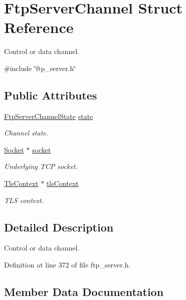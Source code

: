 \hypertarget{structFtpServerChannel}{}\section{Ftp\+Server\+Channel Struct Reference}
\label{structFtpServerChannel}


Control or data channel.  




{\ttfamily \#include \char`\"{}ftp\+\_\+server.\+h\char`\"{}}

\subsection*{Public Attributes}
\begin{DoxyCompactItemize}
\item 
\hyperlink{ftp__server_8h_a925bb5abc66ff43f81be2420bd31156b}{Ftp\+Server\+Channel\+State} \hyperlink{structFtpServerChannel_adee73abc9ffd2c821a30eef99efa9485}{state}
\begin{DoxyCompactList}\small\item\em Channel state. \end{DoxyCompactList}\item 
\hyperlink{socket_8h_aa85acfb0fa336ef495e6ba87fb88fc48}{Socket} $\ast$ \hyperlink{structFtpServerChannel_a1647ab825265d382571d1d48d521d79f}{socket}
\begin{DoxyCompactList}\small\item\em Underlying T\+CP socket. \end{DoxyCompactList}\item 
\hyperlink{tls_8h_ac09f7a286c0cdf9b07ee1edd107946f5}{Tls\+Context} $\ast$ \hyperlink{structFtpServerChannel_a065c9bc8a17772c4aaf652689a8a6d3a}{tls\+Context}
\begin{DoxyCompactList}\small\item\em T\+LS context. \end{DoxyCompactList}\end{DoxyCompactItemize}


\subsection{Detailed Description}
Control or data channel. 

Definition at line 372 of file ftp\+\_\+server.\+h.



\subsection{Member Data Documentation}
\mbox{\label{structFtpServerChannel_a1647ab825265d382571d1d48d521d79f}} 

